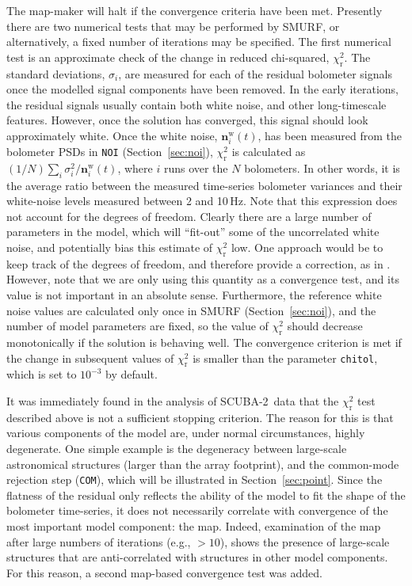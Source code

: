 \documentclass[useAMS,usenatbib,nofootinbib]{mn2e}
\newcommand{\scuba}{SCUBA-2}
\newcommand{\model}[1]{\texttt{#1}}
\begin{document}
The map-maker will halt if the convergence criteria have been
met. Presently there are two numerical tests that may be performed by
SMURF, or alternatively, a fixed number of iterations may be
specified. The first numerical test is an approximate check of the
change in reduced chi-squared, $\chi^2_\mathrm{r}$. The standard
deviations, $\sigma_i$, are measured for each of the residual
bolometer signals once the modelled signal components have been
removed. In the early iterations, the residual signals usually contain
both white noise, and other long-timescale features. However, once the
solution has converged, this signal should look approximately
white. Once the white noise, $\mathbf{n}^\mathrm{w}_i(t)$, has been
measured from the bolometer PSDs in \model{NOI}
(Section~\ref{sec:noi}), $\chi^2_\mathrm{r}$ is calculated as $(1/N)
\sum_i \sigma^2_i / \mathbf{n}^\mathrm{w}_i(t)$, where $i$ runs over
the $N$ bolometers. In other words, it is the average ratio between
the measured time-series bolometer variances and their white-noise
levels measured between 2 and 10\,Hz. Note that this expression does
not account for the degrees of freedom. Clearly there are a large
number of parameters in the model, which will ``fit-out'' some of the
uncorrelated white noise, and potentially bias this estimate of
$\chi^2_\mathrm{r}$ low. One approach would be to keep track of the
degrees of freedom, and therefore provide a correction, as in
\citet{kovacs2008}. However, note that we are only using this quantity
as a convergence test, and its value is not important in an absolute
sense. Furthermore, the reference white noise values are calculated
only once in SMURF (Section~\ref{sec:noi}), and the number of model
parameters are fixed, so the value of $\chi^2_\mathrm{r}$ should
decrease monotonically if the solution is behaving well. The
convergence criterion is met if the change in subsequent values of
$\chi^2_\mathrm{r}$ is smaller than the parameter \texttt{chitol},
which is set to $10^{-3}$ by default.

It was immediately found in the analysis of \scuba\ data that the
$\chi^2_\mathrm{r}$ test described above is not a sufficient stopping
criterion. The reason for this is that various components of the model
are, under normal circumstances, highly degenerate. One simple example
is the degeneracy between large-scale astronomical structures (larger
than the array footprint), and the common-mode rejection step
(\model{COM}), which will be illustrated in
Section~\ref{sec:point}. Since the flatness of the residual only
reflects the ability of the model to fit the shape of the bolometer
time-series, it does not necessarily correlate with convergence of the
most important model component: the map. Indeed, examination of the
map after large numbers of iterations (e.g., $>10$), shows the
presence of large-scale structures that are anti-correlated with
structures in other model components. For this reason, a second
map-based convergence test was added.
\end{document}
